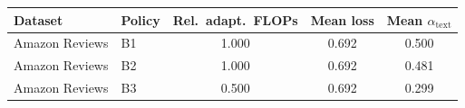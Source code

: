 \begin{tabular}{llccc}
\toprule
Dataset & Policy & Rel.\ adapt.\ FLOPs & Mean loss & Mean $\alpha_{\mathrm{text}}$ \\
\midrule
Amazon Reviews & B1 & 1.000 & 0.692 & 0.500 \\
Amazon Reviews & B2 & 1.000 & 0.692 & 0.481 \\
Amazon Reviews & B3 & 0.500 & 0.692 & 0.299 \\
\bottomrule
\end{tabular}
